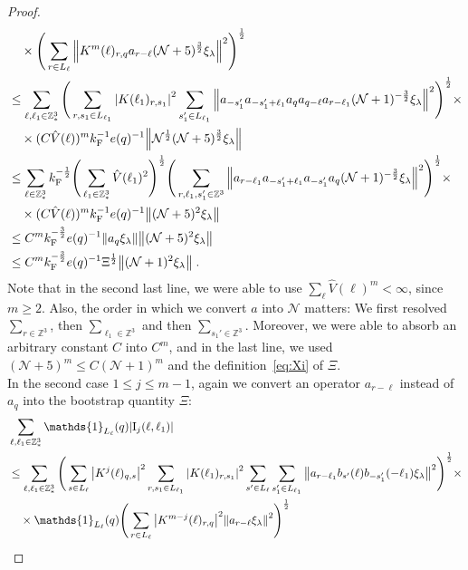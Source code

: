 \documentclass[12pt,a4paper]{article}
\numberwithin{equation}{section}
\newcommand{\cN}{\mathcal{N}}
\newcommand{\1}{\mathbb{I}}
\newcommand{\F}{\mathrm{F}}
\newcommand{\I}{\mathrm{I}}
\newcommand{\Z}{\mathbb{Z}}
\newcommand{\NN}{\mathcal{N}}
\newcommand{\half}{\frac{1}{2}}
\theoremstyle{plain}
\theoremstyle{definition}
\theoremstyle{remark}
\theoremstyle{plain}
\theoremstyle{definition}
\theoremstyle{remark}
\begin{document}
\begin{proof}
\begin{align}
	&\quad \times \Bigg( \sum\limits_{r \in L_\ell} \norm{  K^{m}(\ell)_{r,q} a_{r-\ell} (\NN+5)^{\frac 32}\xi_\lambda }^2\Bigg)^\half \nonumber\\
	&\leq \sum_{\ell,\ell_1 \in \Z^3_*} \Bigg( \sum\limits_{r,s_1 \in L_{\ell_1}}\abs{K(\ell_1)_{r,s_1}}^2 \sum\limits_{s_1' \in L_{\ell_1}} \norm{ a_{-s_1'} a_{-s_1' + \ell_1} a_q a_{q-\ell} a_{r-\ell_1} (\NN+1)^{-\frac 32}\xi_\lambda}^2\Bigg)^\half \times\nonumber\\
	& \quad \times (C \hat{V}(\ell))^m k_{\F}^{-1} e(q)^{-1} \norm{ \NN^\half(\NN+5)^{\frac 32}\xi_\lambda } \nonumber\\
	&\leq \sum_{\ell \in \Z^3_*} k_{\F}^{-\half} \Bigg( \sum_{\ell_1 \in \Z^3_*} \hat{V}(\ell_1)^2 \Bigg)^{\half}
		\Bigg( \sum_{r,\ell_1,s_1' \in \Z^3}
		\norm{ a_{r-\ell_1} a_{-s_1'+\ell_1} a_{-s_1'} a_q  (\NN+1)^{-\frac 32}\xi_\lambda}^2\Bigg)^\half \times\nonumber\\
	& \quad \times (C \hat{V}(\ell))^m k_{\F}^{-1} e(q)^{-1} \norm{ (\NN+5)^2 \xi_\lambda } \nonumber\\
	&\leq C^m k_{\F}^{-\frac 32} e(q)^{-1}
		\norm{ a_q \xi_\lambda} \norm{ (\NN+5)^2 \xi_\lambda } \nonumber\\
	&\leq C^m k_{\F}^{-\frac 32} e(q)^{-1} \Xi^\half
	 	\norm { (\NN+1)^2 \xi_\lambda } \;.\label{eq:estEQ1111}
\end{align}
Note that in the second last line, we were able to use $ \sum_\ell \hat{V}(\ell)^m < \infty $, since $ m \ge 2 $.
Also, the order in which we convert $ a $ into $ \cN $ matters: We first resolved $ \sum_{r \in \Z^3} $, then $ \sum_{\ell_1 \in \Z^3} $  and then $ \sum_{s_1' \in \Z^3} $.
Moreover, we were able to absorb an arbitrary constant $ C $ into $ C^m $, and in the last line, we used $ (\cN+5)^m \le C (\cN+1)^m $ and the definition~\eqref{eq:Xi} of $ \Xi $.\\
In the second case $ 1 \le j \le m-1 $, again we convert an operator $ a_{r-\ell} $ instead of $ a_q $ into the bootstrap quantity $ \Xi $:
\begin{align}
	&\sum_{\ell,\ell_1 \in \Z^3_*} \mathds{1}_{L_\ell}(q) |\I_j(\ell, \ell_1)| \nonumber\\
	&\leq \sum_{\ell,\ell_1 \in \Z^3_*} \Bigg( \sum\limits_{s \in L_\ell} \abs{K^j(\ell)_{q,s}}^2
		\sum\limits_{r, s_1 \in L_{\ell_1}} \abs{K(\ell_1)_{r,s_1}}^2
		\sum\limits_{s' \in L_\ell} \sum\limits_{s_1' \in L_{\ell_1}} \norm{a_{r-\ell_1} b_{s'}(\ell) b_{-s_1'}(-\ell_1) \xi_\lambda}^2 \Bigg)^\half \times \nonumber\\
	&\quad \times \mathds{1}_{L_\ell}(q) \Bigg( \sum\limits_{r\in L_{\ell}} \abs{K^{m-j}(\ell)_{r,q}}^2 \norm{a_{r-\ell} \xi_\lambda }^2 \Bigg)^\half\nonumber\\

\end{align}
\end{proof}
\end{document}
